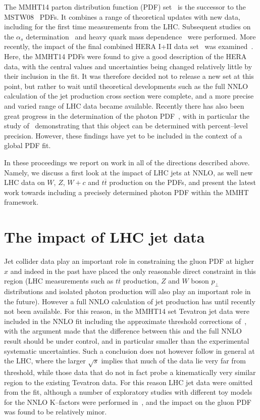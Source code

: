 \documentclass{appolb}
\begin{document}
The MMHT14 parton distribution function (PDF) set~\cite{Harland-Lang:2014zoa} is the successor to the MSTW08~\cite{Martin:2009iq} PDFs. It combines a range of theoretical updates with new data, including for the first time measurements from the LHC. Subsequent studies on the $\alpha_s$ determination~\cite{Harland-Lang:2015nxa} and heavy quark mass dependence~\cite{Harland-Lang:2015qea} were performed. More recently, the impact of the final combined HERA I+II data set~\cite{Abramowicz:2015mha} was examined~\cite{Harland-Lang:2016yfn}. Here, the MMHT14 PDFs were found to give a good description of the HERA data, with the central values and uncertainties being changed relatively little by their inclusion in the fit. It was therefore decided not to release a new set at this point, but rather to wait until theoretical developments such as the full NNLO calculation of the jet production cross section were complete, and a more precise and varied range of LHC data became available. Recently there has also been great progress in the determination of the photon PDF~\cite{Martin:2014nqa,Harland-Lang:2016kog,Manohar:2016nzj}, with in particular the study of~\cite{Manohar:2016nzj} demonstrating that this object can be determined with percent--level precision. However, these findings have yet to be included in the context of a global PDF fit.

In these proceedings we report on work in all of the directions described above. Namely, we discuss a first look at the impact of LHC jets at NNLO, as well new LHC data on $W$, $Z$, $W+c$ and $t\overline{t}$ production on the PDFs, and present the latest work towards including a precisely determined photon PDF within the MMHT framework.

\section{The impact of LHC jet data}

Jet collider data play an important role in constraining the gluon PDF at higher $x$ and indeed in the past have placed the only reasonable direct constraint in this region (LHC measurements such as $t\overline{t}$ production, $Z$ and $W$ boson $p_\perp$ distributions and isolated photon production will also play an important role in the future). 
However a full NNLO calculation of jet production has until recently not been available. For this reason, in the MMHT14 set Tevatron jet data were included in the NNLO fit including the approximate threshold corrections of~\cite{Kidonakis:2000gi}, with the argument made that the difference between this and the full NNLO result should be under control, and in particular smaller than the experimental systematic uncertainties. Such a conclusion does not however follow in general at the LHC, where the larger $\sqrt{s}$ implies that much of the data lie very far from threshold, while those data that do not in fact probe a kinematically very similar region to the existing Tevatron data. For this reason LHC jet data were omitted from the fit, although a number of exploratory studies with different toy models for the NNLO K--factors were performed in~\cite{Harland-Lang:2014zoa}, and the impact on the gluon PDF was found to be relatively minor. 
\end{document}
